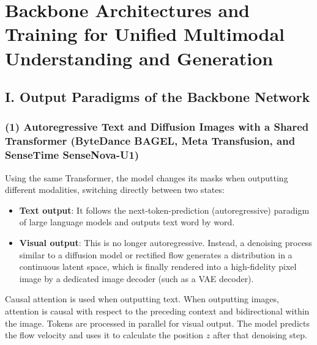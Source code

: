 \setcounter{section}{1}

\hypertarget{backbone-architectures-and-training-for-unified-multimodal-understanding-and-generation}{%
\section{Backbone Architectures and Training for Unified Multimodal Understanding and Generation}\label{backbone-architectures-and-training-for-unified-multimodal-understanding-and-generation}}

\hypertarget{i.-output-paradigms-of-the-backbone-network}{%
\subsection{I. Output Paradigms of the Backbone Network}\label{i.-output-paradigms-of-the-backbone-network}}

\hypertarget{autoregressive-text-and-diffusion-images-with-a-shared-transformer-bytedance-bagel-meta-transfusion-and-sensetime-sensenova-u1}{%
\subsubsection{(1) Autoregressive Text and Diffusion Images with a Shared Transformer (ByteDance BAGEL, Meta Transfusion, and SenseTime SenseNova-U1)}\label{autoregressive-text-and-diffusion-images-with-a-shared-transformer-bytedance-bagel-meta-transfusion-and-sensetime-sensenova-u1}}

Using the same Transformer, the model changes its masks when outputting different modalities, switching directly between two states:

\begin{itemize}
\tightlist
\item
  \textbf{Text output}: It follows the next-token-prediction (autoregressive) paradigm of large language models and outputs text word by word.
\item
  \textbf{Visual output}: This is no longer autoregressive. Instead, a denoising process similar to a diffusion model or rectified flow generates a distribution in a continuous latent space, which is finally rendered into a high-fidelity pixel image by a dedicated image decoder (such as a VAE decoder).
\end{itemize}

Causal attention is used when outputting text. When outputting images, attention is causal with respect to the preceding context and bidirectional within the image. Tokens are processed in parallel for visual output. The model predicts the flow velocity and uses it to calculate the position \(z\) after that denoising step.

